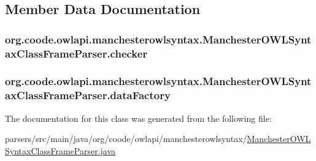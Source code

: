 \subsection{Member Data Documentation}
\hypertarget{classorg_1_1coode_1_1owlapi_1_1manchesterowlsyntax_1_1_manchester_o_w_l_syntax_class_frame_parser_aaf2f055752305d339ee0d0a9d739d515}{
\subsubsection[{checker}]{ org.\-coode.\-owlapi.\-manchesterowlsyntax.\-Manchester\-O\-W\-L\-Syntax\-Class\-Frame\-Parser.\-checker\hspace{0.3cm}{\ttfamily [private]}}}\label{classorg_1_1coode_1_1owlapi_1_1manchesterowlsyntax_1_1_manchester_o_w_l_syntax_class_frame_parser_aaf2f055752305d339ee0d0a9d739d515}
\hypertarget{classorg_1_1coode_1_1owlapi_1_1manchesterowlsyntax_1_1_manchester_o_w_l_syntax_class_frame_parser_a7c0f6c1da45f4620640609d9b4227c2b}{
\subsubsection[{data\-Factory}]{ org.\-coode.\-owlapi.\-manchesterowlsyntax.\-Manchester\-O\-W\-L\-Syntax\-Class\-Frame\-Parser.\-data\-Factory\hspace{0.3cm}{\ttfamily [private]}}}\label{classorg_1_1coode_1_1owlapi_1_1manchesterowlsyntax_1_1_manchester_o_w_l_syntax_class_frame_parser_a7c0f6c1da45f4620640609d9b4227c2b}


The documentation for this class was generated from the following file\-:\begin{DoxyCompactItemize}
\item 
parsers/src/main/java/org/coode/owlapi/manchesterowlsyntax/\hyperlink{_manchester_o_w_l_syntax_class_frame_parser_8java}{Manchester\-O\-W\-L\-Syntax\-Class\-Frame\-Parser.\-java}\end{DoxyCompactItemize}
